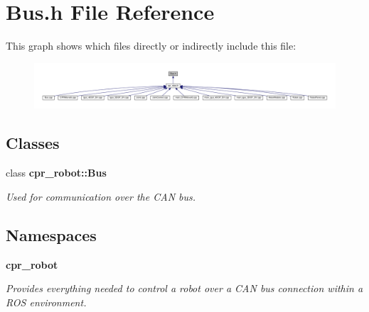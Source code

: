 \section{Bus.\+h File Reference}
\label{Bus_8h}
This graph shows which files directly or indirectly include this file\+:
\nopagebreak
\begin{figure}[H]
\begin{center}
\leavevmode
\includegraphics[width=350pt]{Bus_8h__dep__incl}
\end{center}
\end{figure}
\subsection*{Classes}
\begin{DoxyCompactItemize}
\item 
class \textbf{ cpr\+\_\+robot\+::\+Bus}
\begin{DoxyCompactList}\small\item\em Used for communication over the C\+AN bus. \end{DoxyCompactList}\end{DoxyCompactItemize}
\subsection*{Namespaces}
\begin{DoxyCompactItemize}
\item 
 \textbf{ cpr\+\_\+robot}
\begin{DoxyCompactList}\small\item\em Provides everything needed to control a robot over a C\+AN bus connection within a R\+OS environment. \end{DoxyCompactList}\end{DoxyCompactItemize}

